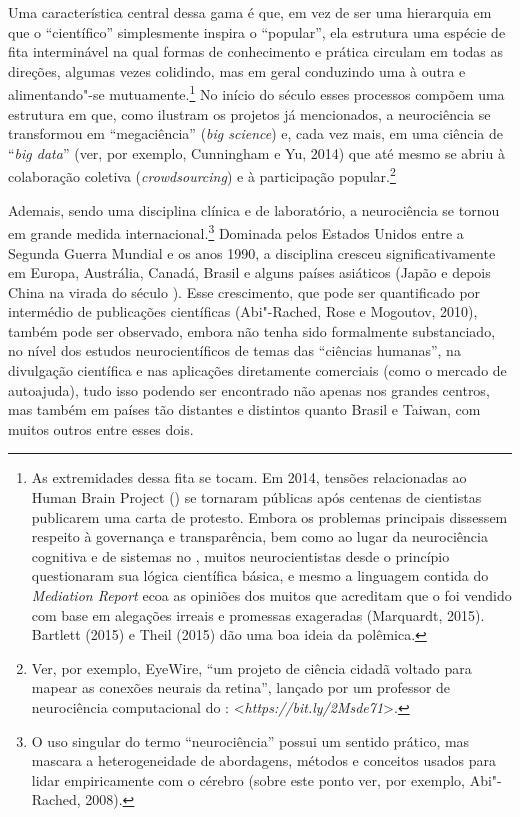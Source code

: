 Uma característica central dessa gama é que, em vez de ser uma
hierarquia em que o ``científico'' simplesmente inspira o ``popular'',
ela estrutura uma espécie de fita interminável na qual formas de
conhecimento e prática circulam em todas as direções, algumas vezes
colidindo, mas em geral conduzindo uma à outra e alimentando"-se
mutuamente.\footnote[4]{As extremidades dessa fita se tocam. Em 2014, tensões relacionadas
ao Human Brain Project () se tornaram públicas após centenas de
cientistas publicarem uma carta de protesto. Embora os problemas
principais dissessem respeito à governança e transparência, bem como ao
lugar da neurociência cognitiva e de sistemas no , muitos
neurocientistas desde o princípio questionaram sua lógica científica
básica, e mesmo a linguagem contida do \emph{Mediation Report} ecoa as
opiniões dos muitos que acreditam que o  foi vendido com base em
alegações irreais e promessas exageradas (Marquardt, 2015). Bartlett
(2015) e Theil (2015) dão uma boa ideia da polêmica.} No início do século  esses processos
compõem uma estrutura em que, como ilustram os projetos já mencionados,
a neurociência se transformou em ``megaciência'' (\emph{big science}) e, cada
vez mais, em uma ciência de ``\emph{big data}'' (ver, por exemplo, Cunningham e
Yu, 2014) que até mesmo se abriu à colaboração coletiva (\emph{crowdsourcing})
e à participação popular.\footnote[5]{Ver, por exemplo, EyeWire, ``um projeto de ciência cidadã voltado
para mapear as conexões neurais da retina'', lançado por um professor de
neurociência computacional do :
\textless{}\emph{https://bit.ly/2Msde71}\textgreater{}.}

Ademais, sendo uma disciplina clínica e de laboratório, a neurociência
se tornou em grande medida internacional.\footnote[6]{O uso singular do termo ``neurociência'' possui um sentido prático,
mas mascara a heterogeneidade de abordagens, métodos e conceitos usados
para lidar empiricamente com o cérebro (sobre este ponto ver, por
exemplo, Abi"-Rached, 2008).} Dominada
pelos Estados Unidos entre a Segunda Guerra Mundial e os anos 1990, a
disciplina cresceu significativamente em Europa, Austrália, Canadá,
Brasil e alguns países asiáticos (Japão e depois China na virada do
século ). Esse crescimento, que pode ser quantificado por intermédio
de publicações científicas (Abi"-Rached, Rose e Mogoutov, 2010), também
pode ser observado, embora não tenha sido formalmente substanciado, no
nível dos estudos neurocientíficos de temas das ``ciências humanas'', na
divulgação científica e nas aplicações diretamente comerciais (como o
mercado de autoajuda), tudo isso podendo ser encontrado não apenas nos
grandes centros, mas também em países tão distantes e distintos quanto
Brasil e Taiwan, com muitos outros entre esses dois.

